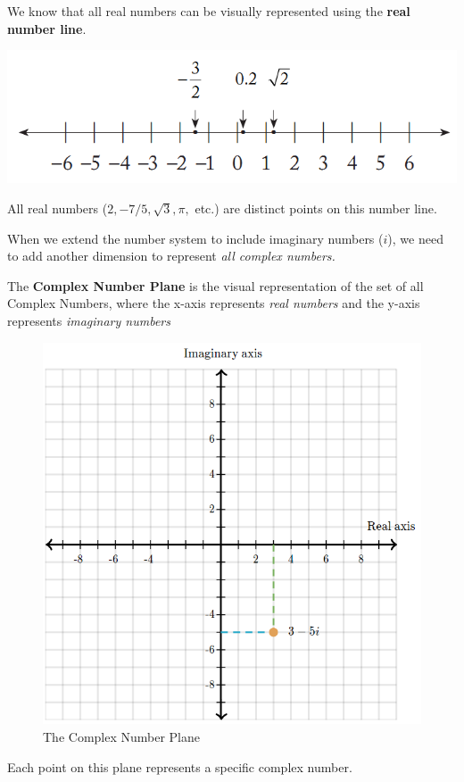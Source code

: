 \documentclass[
  14pt,
]{extarticle}
\begin{document}
We know that all real numbers can be visually represented using the
\textbf{real number line}.

\includegraphics{../images/2022-05-31-01-38-22.png}

All real numbers (\(2, -7/5, \sqrt 3, \pi,\) etc.) are distinct points
on this number line.

When we extend the number system to include imaginary numbers (\(i\)),
we need to add another dimension to represent \emph{all complex
numbers.}

The \textbf{Complex Number Plane} is the visual representation of the
set of all Complex Numbers, where the x-axis represents \emph{real
numbers} and the y-axis represents \emph{imaginary numbers}

\begin{figure}
\centering
\includegraphics[width=4.6875in,height=\textheight]{../images/2022-05-31-01-34-44.png}
\caption{The Complex Number Plane}
\end{figure}

Each point on this plane represents a specific complex number.
\end{document}
